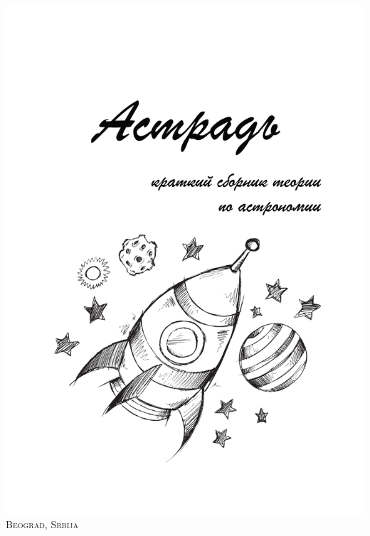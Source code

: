 \newpage
\thispagestyle{empty}
\begin{center}
\includegraphics[width=0.95\tw]{sys/cover.pdf}\\[1pc]
{\scshape Beograd, Srbija \\ \year}	
\end{center}
